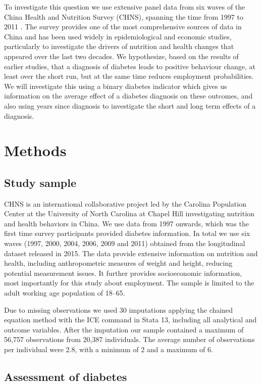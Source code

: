 To investigate this question we use extensive panel data from six waves of the China Health and Nutrition Survey (CHNS), spanning the time from 1997 to 2011 . The survey provides one of the most comprehensive sources of data in China and has been used widely in epidemiological and economic studies, particularly to investigate the drivers of nutrition and health changes that appeared over the last two decades. We hypothesize, based on the results of earlier studies, that a diagnosis of diabetes leads to positive behaviour change, at least over the short run, but at the same time reduces employment probabilities. We will investigate this using a binary diabetes indicator which gives us information on the average effect of a diabetes diagnosis on these outcomes, and also using years since diagnosis to investigate the short and long term effects of a diagnosis. 
\section{Methods}

\subsection*{Study sample}
CHNS is an international collaborative project led by the Carolina Population Center at the University of North Carolina at Chapel Hill investigating nutrition and health behaviors in China. We use data from 1997 onwards, which was the first time survey participants provided diabetes information. In total we use six waves (1997, 2000, 2004, 2006, 2009 and 2011) obtained from the longitudinal dataset released in 2015. The data provide extensive information on nutrition and health, including anthropometric measures of weight and height, reducing potential measurement issues. It further provides socioeconomic information, most importantly for this study about employment. The sample is limited to the adult working age population of 18--65.

Due to missing observations we used 30 imputations applying the chained equation method with the ICE command in Stata 13, including all analytical and outcome variables. After the imputation our sample contained a maximum of 56,757 observations from 20,387 individuals. The average number of observations per individual were 2.8, with a minimum of 2 and a maximum of 6.
 


\subsection*{Assessment of diabetes}

